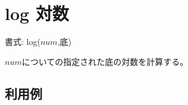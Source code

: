 
%

\section{log 対数\label{sect:log}}

書式: log($num$,底)

$num$についての指定された底の対数を計算する。

\subsection*{利用例}


%
